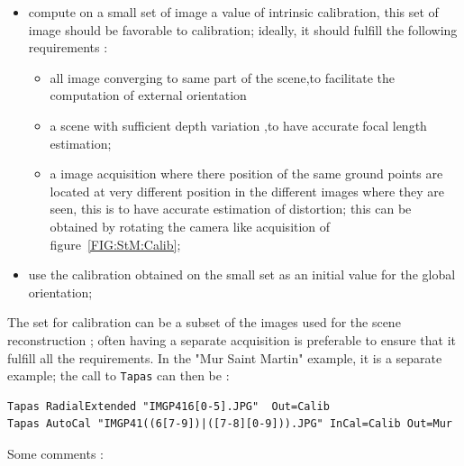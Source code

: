 \begin{itemize}
   \item  compute on a small set of image a value of intrinsic calibration,
          this set of image should be favorable to calibration; ideally,
          it should fulfill the following requirements :

\begin{itemize}
  \item  all image converging  to same part of the scene,to facilitate the computation 
         of external  orientation 

   \item  a scene with sufficient depth variation ,to have accurate focal length estimation;

   \item  a image acquisition where there position of the same ground points are located at
          very different position in the different images where they are seen, this is to
          have accurate estimation of distortion; this can be obtained by rotating the camera
          like acquisition of figure~\ref{FIG:StM:Calib};

\end{itemize}
   \item  use the calibration obtained on the small set as an initial value for
          the global orientation;
\end{itemize}


The set for calibration can be a subset of the images used for the scene
reconstruction ; often having a separate acquisition  is preferable to
ensure that it fulfill all the requirements.
In the "Mur Saint Martin"  example, it is
a separate example;  the call to {\tt Tapas} can then be :


\begin{verbatim}
Tapas RadialExtended "IMGP416[0-5].JPG"  Out=Calib
Tapas AutoCal "IMGP41((6[7-9])|([7-8][0-9])).JPG" InCal=Calib Out=Mur
\end{verbatim}

Some comments :


